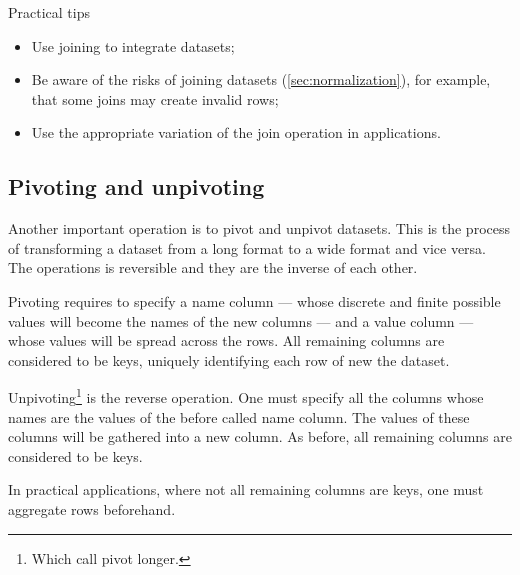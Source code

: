 \begin{mainbox}{Practical tips}
  \begin{itemize}
    \item Use joining to integrate datasets;
    \item Be aware of the risks of joining datasets (\cref{sec:normalization}), for
      example, that some joins may create invalid rows;
    \item Use the appropriate variation of the join operation in applications.
  \end{itemize}
\end{mainbox}

\subsection{Pivoting and unpivoting}

Another important operation is to pivot and unpivot datasets.  This is the process of
transforming a dataset from a long format to a wide format and vice versa.  The operations
is reversible and they are the inverse of each other.

Pivoting requires to specify a name column --- whose discrete and finite possible values
will become the names of the new columns --- and a value column --- whose values will be
spread across the rows.  All remaining columns are considered to be keys, uniquely
identifying each row of new the dataset.

Unpivoting\footnote{Which \citeauthor{Wickham2023} call pivot longer.} is the reverse
operation.  One must specify all the columns whose names are the values of the before
called name column.  The values of these columns will be gathered into a new column.
As before, all remaining columns are considered to be keys.

In practical applications, where not all remaining columns are keys, one must aggregate
rows beforehand.

